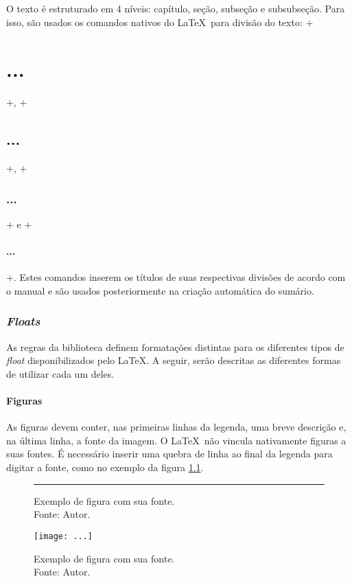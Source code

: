 \documentclass[xindy,rascunho]{fei}
\begin{document}
	O texto é estruturado em 4 níveis: capítulo, seção, subseção e subsubseção. Para isso, são usados os comandos nativos do \LaTeX\ para divisão do texto: \latexinline+\chapter{...}+, \latexinline+\section{...}+, \latexinline+\subsection{...}+ e \latexinline+\subsubsection{...}+. Estes comandos inserem os títulos de suas respectivas divisões de acordo com o manual e são usados posteriormente na criação automática do sumário.

	\subsection{\emph{Floats}}
	
	As regras da biblioteca definem formatações distintas para os diferentes tipos de \emph{float} disponibilizados pelo \LaTeX. A seguir, serão descritas as diferentes formas de utilizar cada um deles.
	
	\subsubsection{Figuras}
	
	As figuras devem conter, nas primeiras linhas da legenda, uma breve descrição e, na última linha, a fonte da imagem. O \LaTeX\ não vincula nativamente figuras a suas fontes. É necessário inserir uma quebra de linha ao final da legenda para digitar a fonte, como no exemplo da figura \ref{fig:exemplo}.
	
	\begin{figure}
	\centering
	\rule{2cm}{2cm}
	\caption{Exemplo de figura com sua fonte.\\Fonte: Autor.} \label{fig:exemplo}
	\end{figure}	

\begin{latexcode}
	\begin{figure}
	\centering
	\texttt{[image: ...]}
	\caption{Exemplo de figura com sua fonte.\\Fonte: Autor.}
	\end{figure}
\end{latexcode}	
	
\end{document}
